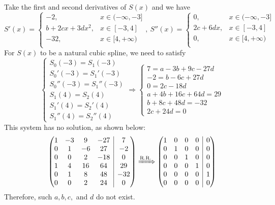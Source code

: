 \documentclass[10pt]{report}
\begin{document}
\begin{enumerate}
	Take the first and second derivatives of $S(x)$ and we have
	\[
	S'(x) = 
	\begin{cases}
	-2, &x\in (-\infty,-3]\\
	b+2cx+3dx^2, &x\in [-3,4]\\
	-32, &x\in [4,+\infty)\\
	\end{cases}
	,\ 
	S''(x) = 
	\begin{cases}
	0, &x\in (-\infty,-3]\\
	2c+6dx, &x\in [-3,4]\\
	0, &x\in [4,+\infty)\\
	\end{cases}
	\]
	For $S(x)$ to be a natural cubic spline, we need to satisfy
	\[
	\begin{cases}
	S_0(-3) = S_1(-3)\\
	S_0'(-3) = S_1'(-3)\\
	S_0''(-3) = S_1''(-3)\\
	S_1(4) = S_2(4)\\
	S_1'(4) = S_2'(4)\\
	S_1''(4) = S_2''(4)
	\end{cases}
	\Rightarrow
	\begin{cases}
	7 = a - 3 b + 9 c - 27 d\\
	-2 = b - 6 c + 27 d\\
	0 = 2 c - 18 d\\
	a + 4 b + 16 c + 64 d = 29\\
	b + 8 c + 48 d = -32\\
	2 c + 24 d = 0
	\end{cases}
	\]
	This system has no solution, as shown below:
	\[
	\left(
	\begin{array}{@{}cccc|c@{}}
		1& -3& 9& -27& 7\\
		0& 1& -6& 27& -2\\
		0& 0& 2& -18& 0\\
		1& 4& 16& 64& 29\\
		0& 1& 8& 48& -32\\
		0& 0& 2& 24& 0
	\end{array}
	\right)
	\xRightarrow{\text{R.R.}}
	\left(
	\begin{array}{@{}cccc|c@{}}
	1& 0& 0& 0& 0\\
	0& 1& 0& 0& 0\\
	0& 0& 1& 0& 0\\
	0& 0& 0& 1& 0\\
	0& 0& 0& 0& 1\\
	0& 0& 0& 0& 0
	\end{array}
	\right)
	\]
	Therefore, such $a,b,c,$ and $d$ do not exist.
\end{enumerate}
\end{document}
